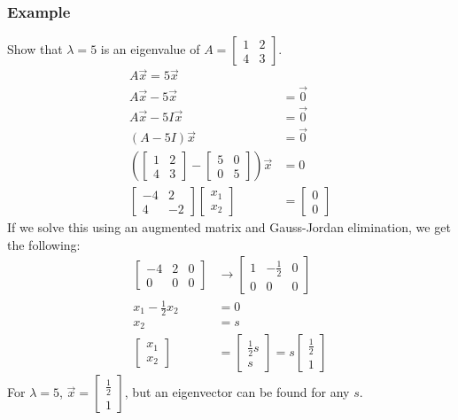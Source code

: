 \documentclass{math}
\begin{document}
\subsubsection*{Example}
Show that \( \lambda = 5 \) is an eigenvalue of \( A = \begin{bmatrix}1 & 2 \\
4 & 3\end{bmatrix} \).
\begin{align*}
  A\vec{x} = 5\vec{x} \\
  A\vec{x}-5\vec{x} &= \vec{0} \\
  A\vec{x}-5I\vec{x} &= \vec{0} \\
  (A-5I)\vec{x} &= \vec{0} \\
  \left(\begin{bmatrix}
    1 & 2 \\
    4 & 3
  \end{bmatrix}-\begin{bmatrix}
    5 & 0 \\
    0 & 5
  \end{bmatrix}\right)\vec{x} &= 0 \\
  \begin{bmatrix}
    -4 & 2 \\
    4 & -2
  \end{bmatrix}\begin{bmatrix}
    x_1 \\ x_2
  \end{bmatrix} &= \begin{bmatrix}
    0 \\ 0
  \end{bmatrix}
\end{align*}
If we solve this using an augmented matrix and Gauss-Jordan elimination, we
get the following:
\begin{align*}
  \begin{bmatrix}
    -4 & 2 & 0 \\
    0 & 0 & 0
  \end{bmatrix} &\to \begin{bmatrix}
    1 & -\frac{1}{2} & 0 \\
    0 & 0 & 0
  \end{bmatrix} \\
  x_1-\frac{1}{2}x_2 &= 0 \\
  x_2 &= s \\
  \begin{bmatrix}
    x_1 \\ x_2
  \end{bmatrix} &= \begin{bmatrix}
    \frac{1}{2}s \\ s
  \end{bmatrix} = s\begin{bmatrix}\frac{1}{2} \\ 1\end{bmatrix}
\end{align*}
For \( \lambda = 5 \), \( \vec{x} = \begin{bmatrix}\frac{1}{2} \\
1\end{bmatrix} \), but an eigenvector can be found for any \( s \).
\end{document}
